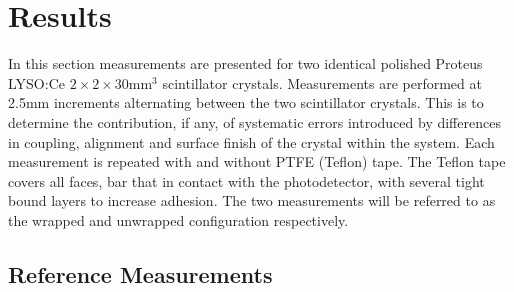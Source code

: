 \section{Results}
In this section measurements are presented for two identical polished Proteus LYSO:Ce $2\times2\times30$mm$^3$ scintillator crystals. Measurements are performed at 2.5mm increments alternating between the two scintillator crystals. This is to determine the contribution, if any, of systematic errors introduced by differences in coupling, alignment and surface finish of the crystal within the system. Each measurement is repeated with and without PTFE (Teflon) tape. The Teflon tape covers all faces, bar that in contact with the photodetector, with several tight bound layers to increase adhesion. The two measurements will be referred to as the wrapped and unwrapped configuration respectively.

\subsection{Reference Measurements}